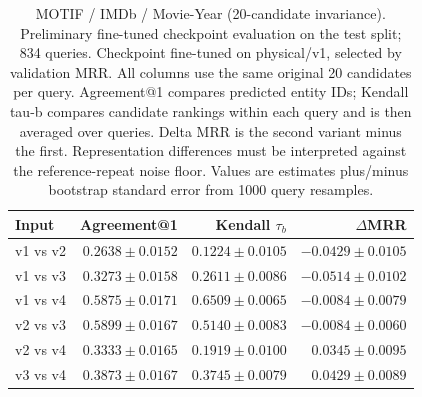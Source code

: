 \begin{table}[t]
\centering
\small
\begin{tabular}{lrrr}
\toprule
Input & Agreement@1 & Kendall $\tau_b$ & $\Delta$MRR \\
\midrule
v1 vs v2 & $0.2638 \pm 0.0152$ & $0.1224 \pm 0.0105$ & $-0.0429 \pm 0.0105$ \\
v1 vs v3 & $0.3273 \pm 0.0158$ & $0.2611 \pm 0.0086$ & $-0.0514 \pm 0.0102$ \\
v1 vs v4 & $0.5875 \pm 0.0171$ & $0.6509 \pm 0.0065$ & $-0.0084 \pm 0.0079$ \\
v2 vs v3 & $0.5899 \pm 0.0167$ & $0.5140 \pm 0.0083$ & $-0.0084 \pm 0.0060$ \\
v2 vs v4 & $0.3333 \pm 0.0165$ & $0.1919 \pm 0.0100$ & $0.0345 \pm 0.0095$ \\
v3 vs v4 & $0.3873 \pm 0.0167$ & $0.3745 \pm 0.0079$ & $0.0429 \pm 0.0089$ \\
\bottomrule
\end{tabular}
\caption{MOTIF / IMDb / Movie-Year (20-candidate invariance). Preliminary fine-tuned checkpoint evaluation on the test split; 834 queries. Checkpoint fine-tuned on physical/v1, selected by validation MRR. All columns use the same original 20 candidates per query. Agreement@1 compares predicted entity IDs; Kendall tau-b compares candidate rankings within each query and is then averaged over queries. Delta MRR is the second variant minus the first. Representation differences must be interpreted against the reference-repeat noise floor. Values are estimates plus/minus bootstrap standard error from 1000 query resamples.}
\label{tab:motif-movie_year-invariance}
\end{table}

